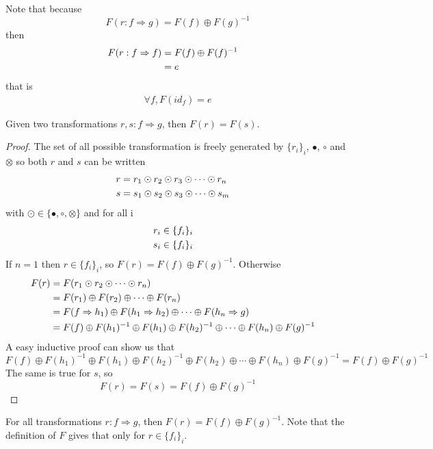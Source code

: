 \documentclass[a4paper]{article}
\begin{document}
\begin{remark}
Note that because
\[
F(r: f \Rightarrow g) = F(f) \oplus F(g)^{-1}
\]
then
\begin{align}
F(r: f \Rightarrow f) &= F(f) \oplus F(f)^{-1} \cr
&= e
\end{align}
that is
\begin{align}
\forall f, F(id_f) = e
\end{align}
\end{remark}

\begin{proposition}
Given two transformations $r, s: f \Rightarrow g$, then $F(r) = F(s)$.

\begin{proof}
The set of all possible transformation is freely generated by $\{r_i\}_i$, $\bullet$, $\circ$ and $\otimes$ so both $r$ and $s$ can be written
\begin{align}
r &= r_1 \odot r_2 \odot r_3 \odot \cdots \odot r_n \cr
s &= s_1 \odot s_2 \odot s_3 \odot \cdots \odot s_m
\end{align}
with $\odot \in \{\bullet, \circ, \otimes\}$ and for all i
\begin{align}
r_i &\in \{f_i\}_i \cr
s_i &\in \{f_i\}_i
\end{align}
If $n = 1$ then $r \in \{f_i\}_i$, so $F(r) = F(f) \oplus F(g)^{-1}$.
Otherwise
\begin{align}
F(r) &= F(r_1 \odot r_2 \odot \cdots \odot r_n) \cr
&= F(r_1) \oplus F(r_2) \oplus \cdots \oplus F(r_n) \cr
&= F(f \Rightarrow h_1) \oplus F(h_1 \Rightarrow h_2) \oplus \cdots \oplus F(h_n \Rightarrow g) \cr
&= F(f) \oplus F(h_1)^{-1} \oplus F(h_1) \oplus F(h_2)^{-1} \oplus \cdots \oplus F(h_n) \oplus F(g)^{-1}
\end{align}
A easy inductive proof can show us that
\[
F(f) \oplus F(h_1)^{-1} \oplus F(h_1) \oplus F(h_2)^{-1} \oplus F(h_2) \oplus \cdots \oplus F(h_n) \oplus F(g)^{-1} = F(f) \oplus F(g)^{-1}
\]
The same is true for $s$, so
\[
F(r) = F(s) = F(f) \oplus F(g)^{-1}
\]
\end{proof}
\end{proposition}

\begin{corollary}
For all transformations $r: f \Rightarrow g$, then $F(r) = F(f) \oplus F(g)^{-1}$.
Note that the definition of $F$ gives that only for $r \in \{f_i\}_i$.
\end{corollary}
\end{document}
